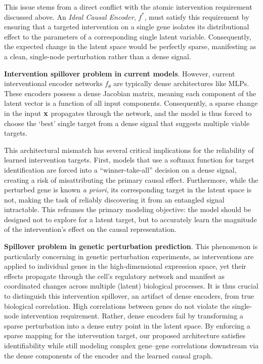 \documentclass[10pt,letterpaper]{article}
\theoremstyle{definition}
\theoremstyle{remark}
\newcommand{\apriori}{\emph{a priori}}
\newcommand{\variables}{\rvx}
\newcommand{\idealencoder}{f^*}
\newcommand{\practicalencoder}{f_\theta}
\begin{document}
This issue stems from a direct conflict with the atomic intervention requirement discussed above.
An \emph{Ideal Causal Encoder}, $\idealencoder$, must satisfy this requirement by ensuring that a targeted intervention on a single gene isolates its distributional effect to the parameters of a corresponding single latent variable.
Consequently, the expected change in the latent space would be perfectly sparse, manifesting as a clean, single-node perturbation rather than a dense signal.

\textbf{Intervention spillover problem in current models}. However, current interventional encoder networks $\practicalencoder$ are typically dense architectures like MLPs.
These encoders possess a dense Jacobian matrix, meaning each component of the latent vector is a function of all input components.
Consequently, a sparse change in the input $\variables$ propagates through the network, and the model is thus forced to choose the `best' single target from a dense signal that suggests multiple viable targets.

This architectural mismatch has several critical implications for the reliability of learned intervention targets.
First, models that use a softmax function for target identification are forced into a ``winner-take-all'' decision on a dense signal, creating a risk of misattributing the primary causal effect.
Furthermore, while the perturbed gene is known \apriori, its corresponding target in the latent space is not, making the task of reliably discovering it from an entangled signal intractable.
This reframes the primary modeling objective: the model should be designed not to explore for a latent target, but to accurately learn the magnitude of the intervention's effect on the causal representation.

\textbf{Spillover problem in genetic perturbation prediction}. This phenomenon is particularly concerning in genetic perturbation experiments, as interventions are applied to individual genes in the high-dimensional expression space, yet their effects propagate through the cell's regulatory network and manifest as coordinated changes across multiple (latent) biological processes.
It is thus crucial to distinguish this intervention spillover, an artifact of dense encoders, from true biological correlation. High correlations between genes do not violate the single-node intervention requirement.
Rather, dense encoders fail by transforming a sparse perturbation into a dense entry point in the latent space.
By enforcing a sparse mapping for the intervention target, our proposed architecture satisfies identifiability while still modeling complex gene--gene correlations downstream via the dense components of the encoder and the learned causal graph.
\end{document}
